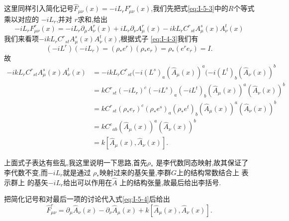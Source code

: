 \documentclass[../main.tex]{subfiles}
\begin{document}
 这里同样引入简化记号$\hat{F}_{\mu\nu}(x) = -i L_r F^r_{\mu\nu}(x)$,我们先把式\ref{eq:I-5-3}中的$R$个等式乘以对应的 $-iL_r$,并对 $r$求和,给出
 \begin{equation}
 \label{eq:I-5-4}
-iL_r F^r_{\mu\nu}(x) = -iL_r\partial_\mu A^r_\nu(x) + iL_r\partial_\nu A^r_\mu(x) -i k L_r C^{r}{}_{st}A^s_\mu(x)A^t_\nu(x) 
 \end{equation} 
 我们来看项$-i k L_r C^{r}{}_{st}A^s_\mu(x)A^t_\nu(x)$,根据式子 \ref{eq:I-4-3}我们有\[
 (-iL^r)(-iL_r) = (\rho_* e^r)(\rho_* e_r) = \rho_* (e^r e_r) = I
 .\] 
 故
 \begin{align*}
 -i k L_r C^{r}{}_{st}A^s_\mu(x)A^t_\nu(x) &= -i k L_r C^{r}{}_{st} (-i(L^s)_a( \hat{A}_\mu(x))^a( -i (L^t)_b (\hat{A}_\nu(x))^b\\
                                           & =  k C^{r}{}_{st}(-iL_r)^c(-iL^s)_a(-iL^t)_b (\hat{A}_\mu(x))^a (\hat{A}_\nu(x))^b\\
                                           & =  k C^{r}{}_{st}(\rho_* e_r)^c(\rho_*e^s)_a(\rho_* e^t)_b (\hat{A}_\mu(x))^a (\hat{A}_\nu(x))^b\\
                                           & = k C^{c}{}_{ab} (\hat{A}_\mu(x))^a (\hat{A}_\nu(x))^b\\
                                           & = k[ \hat{A}_\mu(x) ,\hat{A}_\nu(x)]
 .\end{align*}
 \begin{note}
上面式子表达有些乱,我这里说明一下思路,首先$\rho_*$ 是李代数同态映射,故其保证了李代数不变,而$-iL_r$就是通过 $\rho_*$映射过来的基矢量,李群$G$上的结构常数结合上 表示群上
的基矢$-iL_r$给出可以作用在$\hat{A}$ 上的结构张量,故最后给出李括号.
 \end{note}
 \noindent 把简化记号和对最后一项的讨论代入式\ref{eq:I-5-4}后给出\[
 \hat{F}^r_{\mu\nu} = \partial_\mu \hat{A}_\nu(x) - \partial_\nu \hat{A}_\mu(x) + k [ \hat{A}_\mu(x) ,\hat{A}_\nu(x)]
 .\] 
\end{document}
